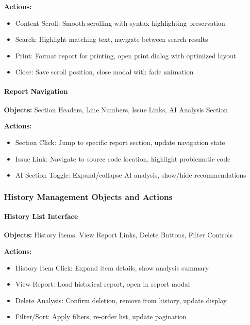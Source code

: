 \documentclass[12pt,a4paper]{article}
\begin{document}
    \textbf{Actions:}
    \begin{itemize}[leftmargin=0.5in]
        \item Content Scroll: Smooth scrolling with syntax highlighting preservation
        \item Search: Highlight matching text, navigate between search results
        \item Print: Format report for printing, open print dialog with optimized layout
        \item Close: Save scroll position, close modal with fade animation
    \end{itemize}

    \paragraph{Report Navigation}
    \textbf{Objects:} Section Headers, Line Numbers, Issue Links, AI Analysis Section

    \textbf{Actions:}
    \begin{itemize}[leftmargin=0.5in]
        \item Section Click: Jump to specific report section, update navigation state
        \item Issue Link: Navigate to source code location, highlight problematic code
        \item AI Section Toggle: Expand/collapse AI analysis, show/hide recommendations
    \end{itemize}

    \subsubsection{History Management Objects and Actions}

    \paragraph{History List Interface}
    \textbf{Objects:} History Items, View Report Links, Delete Buttons, Filter Controls

    \textbf{Actions:}
    \begin{itemize}[leftmargin=0.5in]
        \item History Item Click: Expand item details, show analysis summary
        \item View Report: Load historical report, open in report modal
        \item Delete Analysis: Confirm deletion, remove from history, update display
        \item Filter/Sort: Apply filters, re-order list, update pagination
    \end{itemize}
\end{document}
